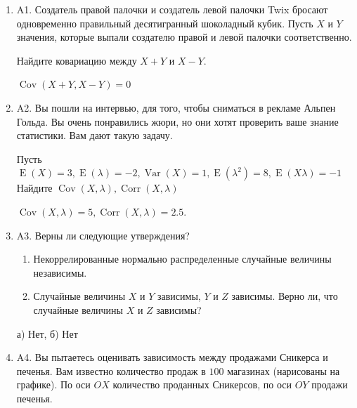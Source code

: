 \documentclass[12pt]{article}
\DeclareMathOperator{\Cov}{Cov}
\DeclareMathOperator{\Corr}{Corr}
\DeclareMathOperator{\Var}{Var}
\DeclareMathOperator{\E}{E}
\newenvironment{problem}{}{}
\newenvironment{sol}{}{} %
\begin{document}
\begin{enumerate}

\begin{problem}
\item[A1.] Создатель правой палочки и создатель левой палочки Twix бросают одновременно правильный десятигранный шоколадный кубик. Пусть $X$ и $Y$ значения, которые выпали создателю правой и левой палочки соответственно.

Найдите ковариацию между $X+Y$ и $X-Y$.

\begin{sol}
$\Cov(X+Y,X-Y) = 0 $
\end{sol}
\end{problem}

\begin{problem}
\item[A2.] Вы пошли на интервью, для того, чтобы сниматься в рекламе Альпен Гольда. Вы очень понравились жюри, но они хотят проверить ваше знание статистики. Вам дают такую задачу.

Пусть $\E(X) = 3, \E(\lambda) = -2, \Var(X) = 1,\E(\lambda^2) = 8, \E(X\lambda) = -1$
Найдите $\Cov(X,\lambda), \Corr(X,\lambda)$

\begin{sol}
$\Cov(X,\lambda) = 5, \Corr(X,\lambda)= 2.5$.
\end{sol}
\end{problem}

\begin{problem}
\item[A3.] Верны ли следующие утверждения?

\begin{enumerate}
\item Некоррелированные нормально распределенные случайные величины независимы.
\item Случайные величины $X$ и $Y$ зависимы, $Y$ и $Z$ зависимы. Верно ли, что случайные величины $X$ и $Z$ зависимы?
\end{enumerate}

\begin{sol}
а) Нет, б) Нет
\end{sol}
\end{problem}

\begin{problem}
\item[A4.] Вы пытаетесь оценивать зависимость между продажами Сникерса и печенья. Вам известно количество продаж в $100$ магазинах (нарисованы на графике). По оси $OX$ количество проданных Сникерсов, по оси $OY$ продажи печенья. 


\end{problem}
\end{enumerate}
\end{document}
